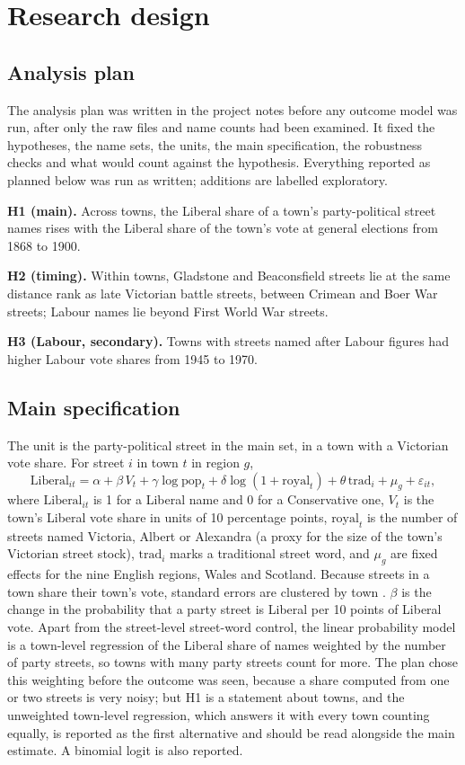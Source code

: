 \documentclass[11pt,a4paper]{article}
\begin{document}
\section{Research design}
\subsection{Analysis plan}
The analysis plan was written in the project notes before any outcome model was run, after only the raw files and name counts had been examined. It fixed the hypotheses, the name sets, the units, the main specification, the robustness checks and what would count against the hypothesis. Everything reported as planned below was run as written; additions are labelled exploratory.

\textbf{H1 (main).} Across towns, the Liberal share of a town's party-political street names rises with the Liberal share of the town's vote at general elections from 1868 to 1900.

\textbf{H2 (timing).} Within towns, Gladstone and Beaconsfield streets lie at the same distance rank as late Victorian battle streets, between Crimean and Boer War streets; Labour names lie beyond First World War streets.

\textbf{H3 (Labour, secondary).} Towns with streets named after Labour figures had higher Labour vote shares from 1945 to 1970.

\subsection{Main specification}
The unit is the party-political street in the main set, in a town with a Victorian vote share. For street $i$ in town $t$ in region $g$,
\[ \text{Liberal}_{it} = \alpha + \beta\, V_t + \gamma \log \text{pop}_t + \delta \log(1+\text{royal}_t) + \theta\, \text{trad}_{i} + \mu_g + \varepsilon_{it}, \]
where $\text{Liberal}_{it}$ is 1 for a Liberal name and 0 for a Conservative one, $V_t$ is the town's Liberal vote share in units of 10 percentage points, $\text{royal}_t$ is the number of streets named Victoria, Albert or Alexandra (a proxy for the size of the town's Victorian street stock), $\text{trad}_i$ marks a traditional street word, and $\mu_g$ are fixed effects for the nine English regions, Wales and Scotland. Because streets in a town share their town's vote, standard errors are clustered by town \citep{cameron2015,abadie2023}. $\beta$ is the change in the probability that a party street is Liberal per 10 points of Liberal vote. Apart from the street-level street-word control, the linear probability model is a town-level regression of the Liberal share of names weighted by the number of party streets, so towns with many party streets count for more. The plan chose this weighting before the outcome was seen, because a share computed from one or two streets is very noisy; but H1 is a statement about towns, and the unweighted town-level regression, which answers it with every town counting equally, is reported as the first alternative and should be read alongside the main estimate. A binomial logit is also reported.
\end{document}

